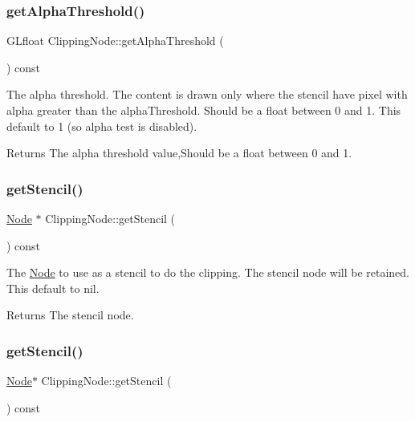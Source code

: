 \subsubsection{\texorpdfstring{get\+Alpha\+Threshold()}{getAlphaThreshold()}\hspace{0.1cm}{\footnotesize\ttfamily [2/2]}}
{\footnotesize\ttfamily G\+Lfloat Clipping\+Node\+::get\+Alpha\+Threshold (\begin{DoxyParamCaption}{ }\end{DoxyParamCaption}) const}

The alpha threshold. The content is drawn only where the stencil have pixel with alpha greater than the alpha\+Threshold. Should be a float between 0 and 1. This default to 1 (so alpha test is disabled).

\begin{DoxyReturn}{Returns}
The alpha threshold value,Should be a float between 0 and 1. 
\end{DoxyReturn}
\mbox{\label{classClippingNode_a3163c62785c7d0af38ba70dd5188d20f}} 
\subsubsection{\texorpdfstring{get\+Stencil()}{getStencil()}\hspace{0.1cm}{\footnotesize\ttfamily [1/2]}}
{\footnotesize\ttfamily \hyperlink{classNode}{Node} $\ast$ Clipping\+Node\+::get\+Stencil (\begin{DoxyParamCaption}{ }\end{DoxyParamCaption}) const}

The \hyperlink{classNode}{Node} to use as a stencil to do the clipping. The stencil node will be retained. This default to nil.

\begin{DoxyReturn}{Returns}
The stencil node. 
\end{DoxyReturn}
\mbox{\label{classClippingNode_aafc3e5b2ad2c7b7d13bb447e1c4f4ff6}} 
\subsubsection{\texorpdfstring{get\+Stencil()}{getStencil()}\hspace{0.1cm}{\footnotesize\ttfamily [2/2]}}
{\footnotesize\ttfamily \hyperlink{classNode}{Node}$\ast$ Clipping\+Node\+::get\+Stencil (\begin{DoxyParamCaption}{ }\end{DoxyParamCaption}) const}

